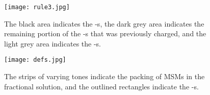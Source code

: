 \documentclass[11pt]{article}
\begin{document}
\begin{figure}[ht]
\center
\texttt{[image: rule3.jpg]}
\caption{The black area indicates the -s, the dark grey area indicates
the remaining portion of the -s that was previously charged, and
the light grey area indicates the -s.}
\label{fig.rule3}
\end{figure}

\bigskip\bigskip\bigskip

\begin{figure}[ht]
\center
\texttt{[image: defs.jpg]}
\caption{The strips of varying tones indicate the packing of MSMs
in the fractional solution, and the outlined rectangles indicate the
-s.}
\label{fig.defs}
\end{figure}
\end{document}
